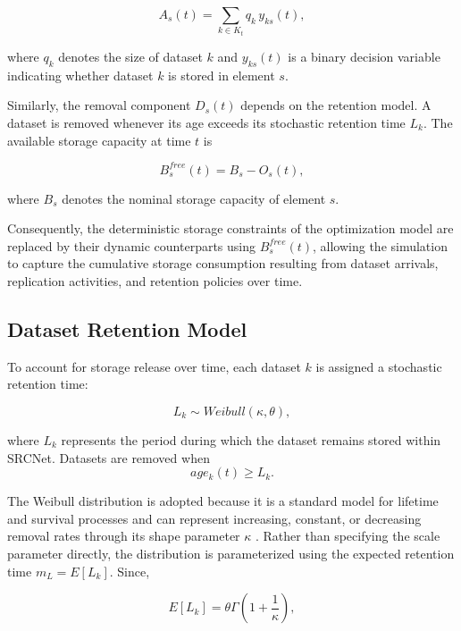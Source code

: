 \documentclass[a4paper,fleqn]{cas-dc}
\begin{document}
\begin{equation} 
A_s(t) = \sum_{k\in K_t} q_k\,y_{ks}(t), 
\end{equation} 

where \(q_k\) denotes the size of dataset \(k\) and \(y_{ks}(t)\) is a binary decision variable indicating whether dataset \(k\) is stored in element \(s\). 

Similarly, the removal component \(D_s(t)\) depends on the retention model. A dataset is removed whenever its age exceeds its stochastic retention time \(L_k\). The available storage capacity at time \(t\) is 

\begin{equation} 
B_s^{free}(t) = B_s-O_s(t), 
\end{equation} 

where \(B_s\) denotes the nominal storage capacity of element \(s\).

Consequently, the deterministic storage constraints of the optimization model are replaced by their dynamic counterparts using \(B_s^{free}(t)\), allowing the simulation to capture the cumulative storage consumption resulting from dataset arrivals, replication activities, and retention policies over time.

\subsection*{Dataset Retention Model}

To account for storage release over time, each dataset \(k\) is assigned a stochastic retention time:

\begin{equation} 
L_k \sim Weibull(\kappa,\theta), 
\end{equation} 

where \(L_k\) represents the period during which the dataset remains stored within SRCNet. Datasets are removed when \begin{equation} age_k(t)\ge L_k. \end{equation} 

The Weibull distribution is adopted because it is a standard model for lifetime and survival processes and can represent increasing, constant, or decreasing removal rates through its shape parameter \(\kappa\) \citep{Kleinbaum2012,Law2015}. Rather than specifying the scale parameter directly, the distribution is parameterized using the expected retention time \(m_L=E[L_k]\). Since, 

\begin{equation} 
E[L_k] = \theta \Gamma \left( 1+\frac{1}{\kappa} \right), 
\end{equation} 
\end{document}
